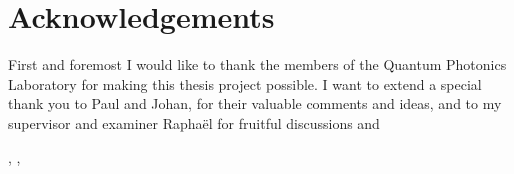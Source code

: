 \thispagestyle{plain}           %
\section*{Acknowledgements}

First and foremost I would like to thank the members of the Quantum Photonics
Laboratory for making this thesis project possible.
I want to extend a special thank you to Paul and Johan, for their valuable
comments and ideas,
and to my supervisor and examiner Raphaël for fruitful discussions and 


\hfill
\thesisAuthor, \thesisCity, \thesisMonth\ \thesisYear

\if{}
\newpage                %
\thispagestyle{empty}
\mbox{}
\fi
